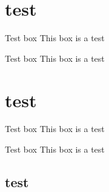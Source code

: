 \documentclass[10pt]{article}
\title{}
\author{Connor Haynes}
\date{}
\begin{document}
\section{test}
\begin{boxEx}{Test box}
  This box is a test
\end{boxEx}
\begin{boxProb}{Test box}
  This box is a test
\end{boxProb}
\section{test}
\begin{boxDef}{Test box}
  This box is a test
\end{boxDef}
\begin{boxNote}{Test box}
  This box is a test
\end{boxNote}
\subsection{test}
\end{document}
